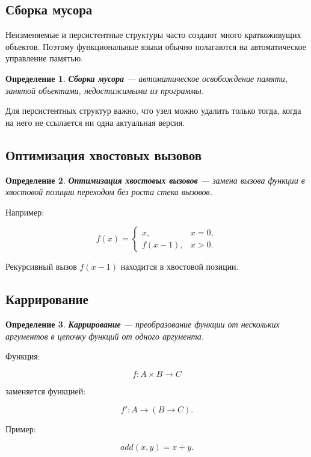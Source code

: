 \documentclass[12pt,a4paper]{article}
\newtheorem{definition}{Определение}
\begin{document}
\subsection{Сборка мусора}

Неизменяемые и персистентные структуры часто создают много краткоживущих объектов. Поэтому функциональные языки обычно полагаются на автоматическое управление памятью.

\begin{definition}
\textbf{Сборка мусора} --- автоматическое освобождение памяти, занятой объектами, недостижимыми из программы.
\end{definition}

Для персистентных структур важно, что узел можно удалить только тогда, когда на него не ссылается ни одна актуальная версия.

\subsection{Оптимизация хвостовых вызовов}

\begin{definition}
\textbf{Оптимизация хвостовых вызовов} --- замена вызова функции в хвостовой позиции переходом без роста стека вызовов.
\end{definition}

Например:

\[
f(x) =
\begin{cases}
x, & x = 0, \\
f(x-1), & x > 0.
\end{cases}
\]

Рекурсивный вызов $f(x-1)$ находится в хвостовой позиции.

\subsection{Каррирование}

\begin{definition}
\textbf{Каррирование} --- преобразование функции от нескольких аргументов в цепочку функций от одного аргумента.
\end{definition}

Функция:

\[
f : A \times B \to C
\]

заменяется функцией:

\[
f' : A \to (B \to C).
\]

Пример:

\[
add(x,y)=x+y.
\]
\end{document}
